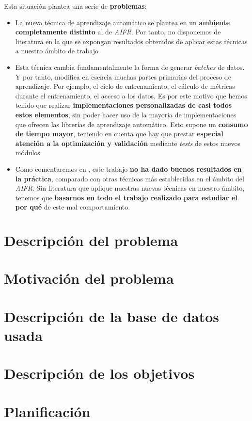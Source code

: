 Esta situación plantea una serie de \textbf{problemas}:

\begin{itemize}
    \item La nueva técnica de aprendizaje automático se plantea en un \textbf{ambiente completamente distinto} al de \textit{AIFR}. Por tanto, no disponemos de literatura en la que se expongan resultados obtenidos de aplicar estas técnicas a nuestro ámbito de trabajo
    \item Esta técnica cambia fundamentalmente la forma de generar \textit{batches} de datos. Y por tanto, modifica en esencia muchas partes primarias del proceso de aprendizaje. Por ejemplo, el ciclo de entrenamiento, el cálculo de métricas durante el entrenamiento, el acceso a los datos. Es por este motivo que hemos tenido que realizar \textbf{implementaciones personalizadas de casi todos estos elementos}, sin poder hacer uso de la mayoría de implementaciones que ofrecen las librerías de aprendizaje automático. Esto supone un \textbf{consumo de tiempo mayor}, teniendo en cuenta que hay que prestar \textbf{especial atención a la optimización y validación} mediante \textit{tests} de estos nuevos módulos
    \item Como comentaremos en , este trabajo \textbf{no ha dado buenos resultados en la práctica}, comparado con otras técnicas más establecidas en el ámbito del \textit{AIFR}. Sin literatura que aplique nuestras nuevas técnicas en nuestro ámbito, tenemos que \textbf{basarnos en todo el trabajo realizado para estudiar el por qué} de este mal comportamiento.
\end{itemize}

\section{Descripción del problema}

\section{Motivación del problema}

\section{Descripción de la base de datos usada}

\section{Descripción de los objetivos}

\section{Planificación}

\section{}
